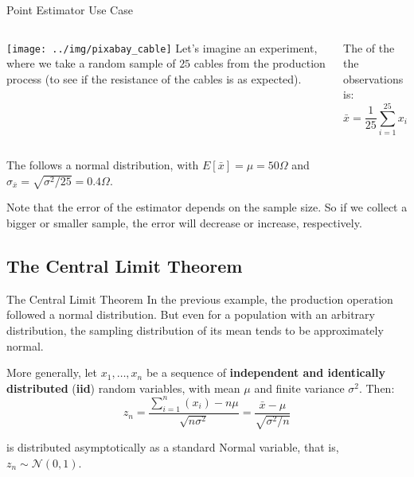 \begin{frame}{Point Estimator Use Case}
  \begin{columns}[T]
    \hspace{.05\textwidth}\texttt{[image: ../img/pixabay\_cable]}
    Let's imagine an experiment, where we take a random sample of $25$ cables
    from the production process (to see if the resistance of the cables is as
    expected).\bigskip

    The  of the the observations is:
    \begin{equation*}
    \bar{x} = \frac{1}{25}\sum\limits_{i=1}^{25}{x_i}
    \end{equation*}
  \end{columns}
  \bigskip



The  follows a normal distribution, with $E[\bar{x}] = \mu = 50\Omega$ and $\sigma_{\bar{x}} = \sqrt{\sigma^2/25} = 0.4\Omega$.\bigskip

Note that the error of the estimator depends on the sample size. So if we collect a bigger or smaller sample, the error will decrease or increase, respectively.
\end{frame}


\subsection{The Central Limit Theorem}

\begin{frame}{The Central Limit Theorem}
In the previous example, the production operation followed a normal distribution. But even for a population with an arbitrary distribution, the sampling distribution of its mean tends to be approximately normal.
\bigskip

More generally, let $x_1,\ldots,x_n$ be a sequence of \textbf{independent and identically distributed} (\textbf{iid}) random variables, with mean $\mu$ and finite variance $\sigma^2$. Then:
\begin{equation*}
z_n = \frac{\sum\limits_{i=1}^{n}{(x_i)} - n\mu}{\sqrt{n\sigma^2}} = \frac{\bar{x} - \mu}{\sqrt{\sigma^2/n}}
\end{equation*}

is distributed asymptotically as a standard Normal variable, that is, $z_n\sim\mathcal{N}(0,1)$.
\end{frame}

